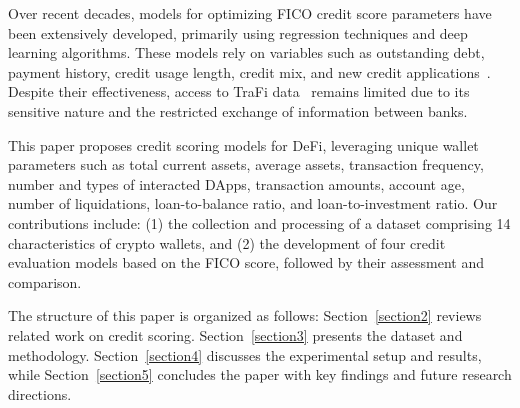 \documentclass[runningheads]{llncs}
\begin{document}

Over recent decades, models for optimizing FICO credit score parameters have been extensively developed, primarily using regression techniques and deep learning algorithms. These models rely on variables such as outstanding debt, payment history, credit usage length, credit mix, and new credit applications~\cite{homonoff2021does}.
Despite their effectiveness, access to TraFi data~\cite{munkhdalai2019empirical} remains limited due to its sensitive nature and the restricted exchange of information between banks.

This paper proposes credit scoring models for DeFi, leveraging unique wallet parameters such as total current assets, average assets, transaction frequency, number and types of interacted DApps, transaction amounts, account age, number of liquidations, loan-to-balance ratio, and loan-to-investment ratio. Our contributions include: (1) the collection and processing of a dataset comprising 14 characteristics of crypto wallets, and (2) the development of four credit evaluation models based on the FICO score, followed by their assessment and comparison.

The structure of this paper is organized as follows: Section~\ref{section2} reviews related work on credit scoring. Section~\ref{section3} presents the dataset and methodology. Section~\ref{section4} discusses the experimental setup and results, while Section~\ref{section5} concludes the paper with key findings and future research directions.
\end{document}
